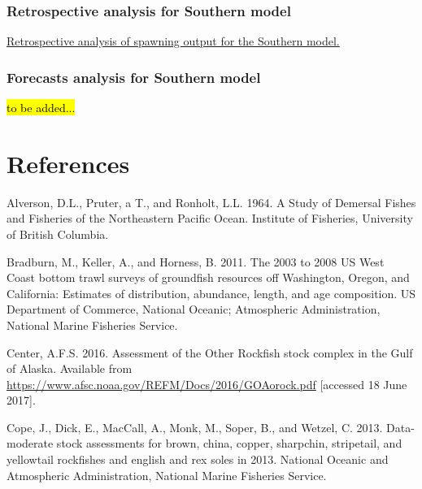 \documentclass[12pt,]{article}
\begin{document}
\FloatBarrier

\subsubsection{Retrospective analysis for Southern
model}\label{retrospective-analysis-for-southern-model}

\href{Figures/retrospectives/retro.S_compare1_spawnbio.png}{Retrospective
analysis of spawning output for the Southern model. \label{fig:retro.S}}

\subsubsection{Forecasts analysis for Southern
model}\label{forecasts-analysis-for-southern-model}

\hl{to be added...}

\FloatBarrier

\newpage

\color{black}

\section*{References}\label{references}

\renewcommand{\thepage}{}




\newpage

\hypertarget{refs}{}
\hypertarget{ref-Alverson1964}{}
Alverson, D.L., Pruter, a T., and Ronholt, L.L. 1964. A Study of
Demersal Fishes and Fisheries of the Northeastern Pacific Ocean.
Institute of Fisheries, University of British Columbia.

\hypertarget{ref-Bradburn2011}{}
Bradburn, M., Keller, A., and Horness, B. 2011. The 2003 to 2008 US West
Coast bottom trawl surveys of groundfish resources off Washington,
Oregon, and California: Estimates of distribution, abundance, length,
and age composition. US Department of Commerce, National Oceanic;
Atmospheric Administration, National Marine Fisheries Service.

\hypertarget{ref-AFSC2016}{}
Center, A.F.S. 2016. Assessment of the Other Rockfish stock complex in
the Gulf of Alaska. Available from
\url{https://www.afsc.noaa.gov/REFM/Docs/2016/GOAorock.pdf} {[}accessed
18 June 2017{]}.

\hypertarget{ref-Cope2013}{}
Cope, J., Dick, E., MacCall, A., Monk, M., Soper, B., and Wetzel, C.
2013. Data-moderate stock assessments for brown, china, copper,
sharpchin, stripetail, and yellowtail rockfishes and english and rex
soles in 2013. National Oceanic and Atmospheric Administration, National
Marine Fisheries Service.
\end{document}
